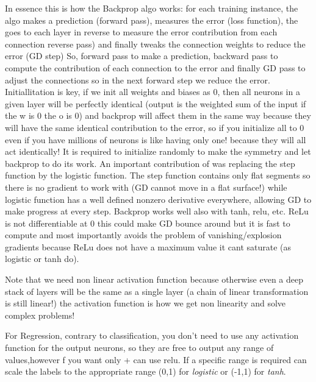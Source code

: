 \documentclass[9pt,twocolumn,twoside]{pnas-new}
\begin{document}
In essence this is how the Backprop algo works: for each training instance, the algo makes a prediction (forward pass), measures the error (loss function), the goes to each layer in reverse to measure the error contribution from each connection reverse pass) and finally tweaks the connection weights to reduce the error (GD step)
So, forward pass to make a prediction, backward pass to compute the contribution of each connection to the error and finally GD pass to adjust the connections so in the next forward step we reduce the error.
Initiallitation is key, if we init all weights and biases as 0, then all neurons in a given layer will be perfectly identical (output is the weighted sum of the input if the w is 0 the o is 0) and backprop will affect them in the same way because they will have the same identical contribution to the error, so if you initialize all to 0 even if you have millions of neurons is like having only one! because they will all act identically!
It is required to initialize randomly to make the symmetry and let backprop to do its work.
An important contribution of \cite{rumellhart1986learning} was replacing the step function by the logistic function. The step function contains only flat segments so there is no gradient to work with (GD cannot move in a flat surface!) while logistic function has a well defined nonzero derivative everywhere, allowing GD to make progress at every step. Backprop works well also with tanh, relu, etc.
ReLu is not differentiable at 0 this could make GD bounce around but it is fast to compute and most importantly avoids the problem of vanishing/explosion gradients because ReLu does not have a maximum value it cant saturate (as logistic or tanh do).

Note that we need non linear activation function because otherwise even a deep stack of layers will be the same as a single layer (a chain of linear transformation is still linear!) the activation function is how we get non linearity and solve complex problems!


For Regression, contrary to classification, you don't need to use any activation function for the output neurons, so they are free to output any range of values,however f you want only + can use relu. If a specific range is required can scale the labels to the appropriate range (0,1) for  \emph{logistic} or (-1,1) for \emph{tanh}.














\end{document}
